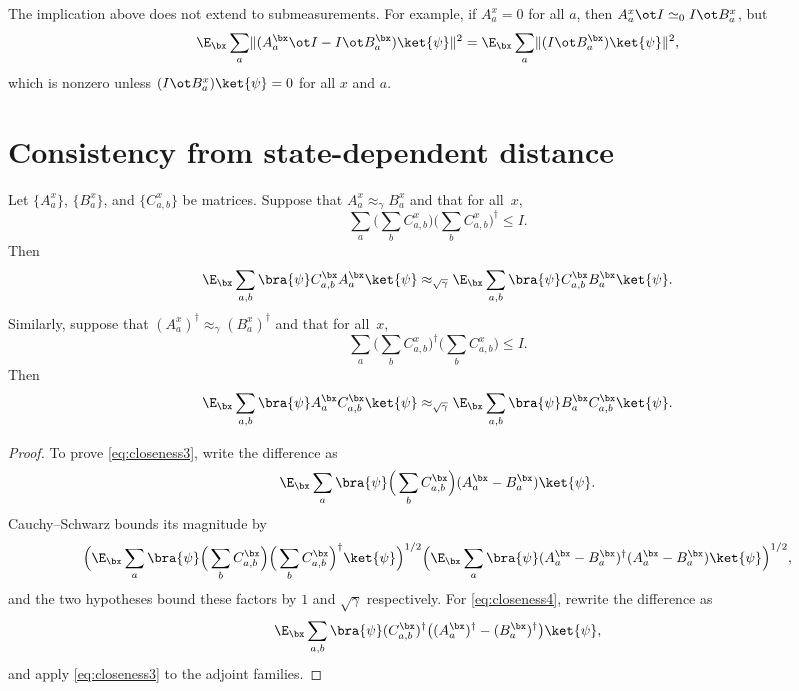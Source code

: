 \begin{remark}\label{rem:simeq-not-approx-submeas}
	The implication above does not extend to submeasurements. For example, if
	$A_a^x=0$ for all $a$, then $A_a^x \ot I \simeq_0 I \ot B_a^x$, but
	\[
		\E_{\bx} \sum_a \lVert (A^{\bx}_a \ot I - I \ot B^{\bx}_a)\ket{\psi} \rVert^2
		= \E_{\bx} \sum_a \lVert (I \ot B^{\bx}_a)\ket{\psi} \rVert^2,
	\]
	which is nonzero unless $(I \ot B_a^x)\ket{\psi}=0$ for all $x$ and $a$.
\end{remark}

\section{Consistency from state-dependent distance}
\label{sec:consistency-from-state-dependent-distance}

\begin{theorem}\label{prop:closeness-of-ip}
	\leanok
	Let $\{A^x_a\}$, $\{B^x_a\}$, and $\{C^x_{a,b}\}$ be matrices. Suppose that $A^x_a \approx_\gamma B^x_a$ and that for all~$x$,
	\[
		\sum_a \Big(\sum_b C^x_{a,b}\Big) \Big(\sum_b C^x_{a,b}\Big)^\dagger \le I.
	\]
	Then
	\begin{equation}
		\E_{\bx} \sum_{a,b} \bra{\psi} C^{\bx}_{a,b} A^{\bx}_a  \ket{\psi} \approx_{\sqrt{\gamma}} \E_{\bx} \sum_{a,b} \bra{\psi} C^{\bx}_{a,b} B^{\bx}_a  \ket{\psi}. \label{eq:closeness3}
	\end{equation}
	Similarly, suppose that $(A^x_a)^\dagger \approx_\gamma (B^x_a)^\dagger$ and that for all~$x$,
	\[
		\sum_a \Big(\sum_b C^x_{a,b}\Big)^\dagger \Big(\sum_b C^x_{a,b}\Big) \le I.
	\]
	Then
	\begin{equation}
		\E_{\bx} \sum_{a,b} \bra{\psi} A^{\bx}_a  C^{\bx}_{a,b} \ket{\psi} \approx_{\sqrt{\gamma}} \E_{\bx} \sum_{a,b} \bra{\psi} B^{\bx}_a  C^{\bx}_{a,b}  \ket{\psi}. \label{eq:closeness4}
	\end{equation}
\end{theorem}
\begin{proof}
	\leanok
	To prove \eqref{eq:closeness3}, write the difference as
	\[
		\E_{\bx} \sum_a \bra{\psi} \Big(\sum_b C^\bx_{a,b}\Big) (A^\bx_a-B^\bx_a) \ket{\psi}.
	\]
	Cauchy--Schwarz bounds its magnitude by
	\[
		\Big( \E_{\bx} \sum_a \bra{\psi} \Big(\sum_b C^{\bx}_{a,b}\Big)\Big(\sum_b C^{\bx}_{a,b}\Big)^\dagger \ket{\psi} \Big)^{1/2}
		\Big( \E_{\bx} \sum_a \bra{\psi} (A^{\bx}_a - B^{\bx}_a)^\dagger (A^{\bx}_a - B^{\bx}_a) \ket{\psi} \Big)^{1/2},
	\]
	and the two hypotheses bound these factors by $1$ and $\sqrt{\gamma}$ respectively. For \eqref{eq:closeness4}, rewrite the difference as
	\[
		\E_{\bx} \sum_{a,b} \bra{\psi} (C^{\bx}_{a,b})^\dagger \big((A^{\bx}_a)^\dagger-(B^{\bx}_a)^\dagger\big) \ket{\psi},
	\]
	and apply \eqref{eq:closeness3} to the adjoint families.
\end{proof}

